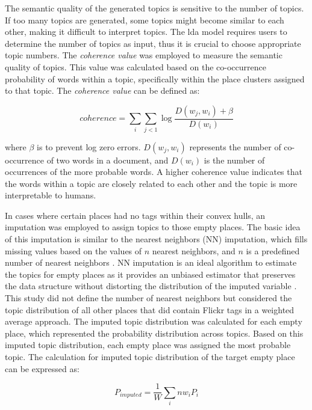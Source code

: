 \documentclass{article}
\theoremstyle{remark}
\begin{document}
The semantic quality of the generated topics is sensitive to the number of topics. If too many topics are generated, some topics might become similar to each other, making it difficult to interpret topics. The \acrshort{lda} model requires users to determine the number of topics as input, thus it is crucial to choose appropriate topic numbers. The \textit{coherence value} was employed to measure the semantic quality of topics. This value was calculated based on the co-occurrence probability of words within a topic, specifically within the place clusters assigned to that topic. The \textit{coherence value} can be defined as:

\begin{equation} \label{eq:coherence_value}
    coherence = \sum_{i}\sum_{j<1}\log\frac{D(w_{j},w_{i})+\beta}{D(w_{i})}
\end{equation}

where $\beta$ is to prevent log zero errors. $D(w_{j},w_{i})$ represents the number of co-occurrence of two words in a document, and $D(w_{i})$ is the number of occurrences of the more probable words. A higher coherence value indicates that the words within a topic are closely related to each other and the topic is more interpretable to humans.

In cases where certain places had no tags within their convex hulls, an imputation was employed to assign topics to those empty places. The basic idea of this imputation is similar to the nearest neighbors (NN) imputation, which fills missing values based on the values of $n$ nearest neighbors, and $n$ is a predefined number of nearest neighbors \citep{troyanskaya_missing_2001}. NN imputation is an ideal algorithm to estimate the topics for empty places as it provides an unbiased estimator that preserves the data structure without distorting the distribution of the imputed variable \citep{beretta_nearest_2016}. This study did not define the number of nearest neighbors but considered the topic distribution of all other places that did contain Flickr tags in a weighted average approach. The imputed topic distribution was calculated for each empty place, which represented the probability distribution across topics. Based on this imputed topic distribution, each empty place was assigned the most probable topic. The calculation for imputed topic distribution of the target empty place can be expressed as:

\begin{equation} \label{eq:topic_imputation}
    P_{imputed} = \frac{1}{W}\sum_{i}{n}w_{i}P_{i}
\end{equation}
\end{document}
